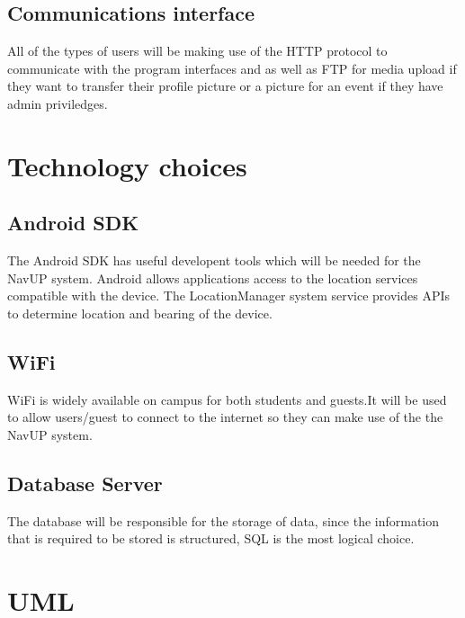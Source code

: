 \documentclass[12pt,a4paper]{article}
\begin{document}
        \subsection{Communications interface}
        All of the types of users will be making use of the HTTP protocol to communicate with the program interfaces and as well as FTP for media upload if they want to transfer their profile picture or a picture for an event if they have admin priviledges.

\section{Technology choices}
        \subsection{Android SDK}
        The Android SDK has useful developent tools which will be needed for the NavUP system. Android allows applications access to the location services compatible with the device. The LocationManager system service provides APIs to determine location and bearing of the device.
        \subsection{WiFi}
        WiFi is widely available on campus for both students and guests.It will be used to allow users/guest to connect to the internet so they can make use of the the NavUP system.
        \subsection{Database Server}
        The database will be responsible for the storage of data, since the information that is required to be stored is structured, SQL is the most logical choice.
     	
\section{UML}
\end{document}
